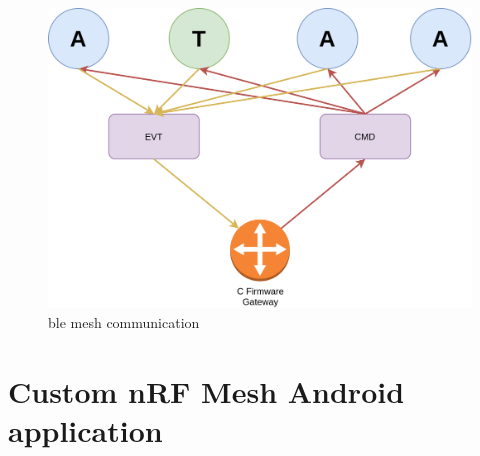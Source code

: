 \documentclass[\main/main.tex]{subfiles}
\begin{document}
\begin{figure}[H]
    \begin{center}
        \includegraphics[scale=0.3]{ble_mesh_comunication.png}
    \end{center}
    \caption{ble mesh communication}
    \label{fig:ble_mesh_comunication}
\end{figure}

\section{Custom nRF Mesh Android application}
\bib
\end{document}
